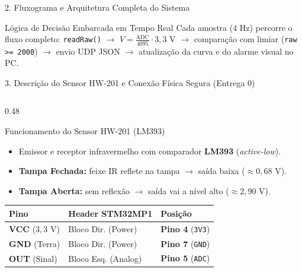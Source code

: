 \documentclass[aspectratio=169,10pt]{beamer}
\begin{document}
\begin{frame}{2. Fluxograma e Arquitetura Completa do Sistema}
  \vspace{0.35cm}
  \begin{block}{L\'{o}gica de Decis\~{a}o Embarcada em Tempo Real}
    \footnotesize
    Cada amostra ($4\text{ Hz}$) percorre o fluxo completo: \texttt{readRaw()} $\rightarrow$ $V = \frac{\text{ADC}}{4095}\cdot 3{,}3\text{ V}$ $\rightarrow$ compara\c{c}\~{a}o com limiar (\texttt{raw >= 2000}) $\rightarrow$ envio UDP JSON $\rightarrow$ atualiza\c{c}\~{a}o da curva e do alarme visual no PC.
  \end{block}
\end{frame}

\begin{frame}{3. Descri\c{c}\~{a}o do Sensor HW-201 e Conex\~{a}o F\'{i}sica Segura (Entrega 0)}
  \begin{columns}[T,onlytextwidth]
    \begin{column}{0.48\textwidth}
      \begin{block}{Funcionamento do Sensor HW-201 (LM393)}
        \begin{itemize}
          \item Emissor e receptor infravermelho com comparador \textbf{LM393} (\textit{active-low}).
          \item \textbf{Tampa Fechada:} feixe IR reflete na tampa $\rightarrow$ sa\'{i}da baixa ($\approx 0{,}68\text{ V}$).
          \item \textbf{Tampa Aberta:} sem reflex\~{a}o $\rightarrow$ sa\'{i}da vai a n\'{i}vel alto ($\approx 2{,}90\text{ V}$).
        \end{itemize}
      \end{block}

      \vspace{0.08cm}
      \scriptsize
      \begin{tabular}{lll}
        \toprule
        \textbf{Pino} & \textbf{Header STM32MP1} & \textbf{Posi\c{c}\~{a}o} \\
        \midrule
        \textbf{VCC} ($3{,}3\text{ V}$) & Bloco Dir. (Power) & \textbf{Pino 4} (\texttt{3V3}) \\
        \textbf{GND} (Terra) & Bloco Dir. (Power) & \textbf{Pino 7} (\texttt{GND}) \\
        \textbf{OUT} (Sinal) & Bloco Esq. (Analog) & \textbf{Pino 5} (\texttt{ADC}) \\
        \bottomrule
      \end{tabular}
    \end{column}


\end{columns}
\end{frame}
\end{document}

